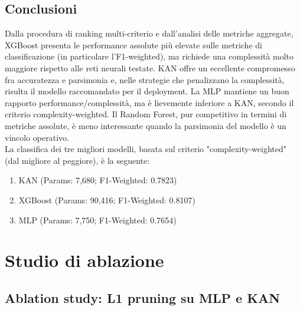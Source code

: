 \documentclass[a4paper,12pt]{report}
\begin{document}
	\subsection{Conclusioni}
	Dalla procedura di ranking multi-criterio e dall'analisi delle metriche aggregate, XGBoost presenta le performance assolute più elevate sulle metriche di classificazione (in particolare l'F1-weighted), ma richiede una complessità molto maggiore rispetto alle reti neurali testate. KAN offre un eccellente compromesso fra accuratezza e parsimonia e, nelle strategie che penalizzano la complessità, risulta il modello raccomandato per il deployment. La MLP mantiene un buon rapporto performance/complessità, ma è lievemente inferiore a KAN, secondo il criterio complexity-weighted. Il Random Forest, pur competitivo in termini di metriche assolute, è meno interessante quando la parsimonia del modello è un vincolo operativo. \\
	La classifica dei tre migliori modelli, basata sul criterio "complexity-weighted" (dal migliore al peggiore), è la seguente:
	\begin{enumerate}
		\item KAN \quad (Params: 7,680; F1-Weighted: 0.7823)
		\item XGBoost \quad (Params: 90,416; F1-Weighted: 0.8107)
		\item MLP \quad (Params: 7,750; F1-Weighted: 0.7654)
	\end{enumerate}
	
	\section{Studio di ablazione}
	
	\subsection{Ablation study: L1 pruning su MLP e KAN}
	
\end{document}
